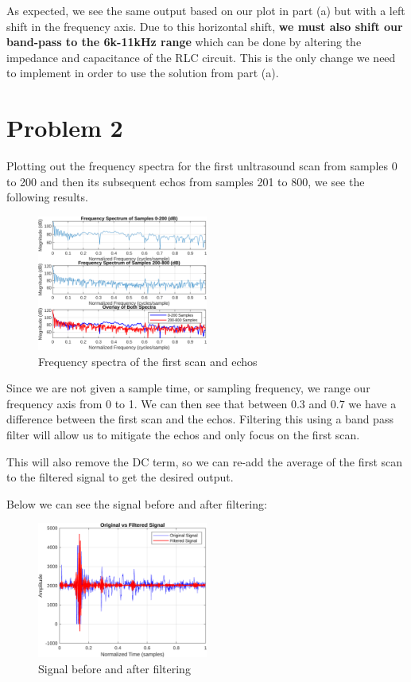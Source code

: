 \documentclass{article}
\begin{document}
As expected, we see the same output based on our plot in part (a) but with a left shift in the frequency axis. Due to this horizontal shift, \textbf{we must also shift our band-pass to the 6k-11kHz range}  which can be done by altering the impedance and capacitance of the RLC circuit. This is the only change we need to implement in order to use the solution from part (a).

\section{Problem 2}
Plotting out the frequency spectra for the first unltrasound scan from samples 0 to 200 and then its subsequent echos from samples 201 to 800, we see the following results.

\begin{figure}[ht!]
    \centering
    \includegraphics[width=0.5\textwidth]{p2_1.png}
    \caption{Frequency spectra of the first scan and echos}
\end{figure}

Since we are not given a sample time, or sampling frequency, we range our frequency axis from 0 to 1. We can then see that between 0.3 and 0.7 we have a difference between the first scan and the echos. Filtering this using a band pass filter will allow us to mitigate the echos and only focus on the first scan.

This will also remove the DC term, so we can re-add the average of the first scan to the filtered signal to get the desired output.

Below we can see the signal before and after filtering:
\begin{figure}[ht!]
    \centering
    \includegraphics[width=0.5\textwidth]{p2_2.png}
    \caption{Signal before and after filtering}
\end{figure}
\end{document}
